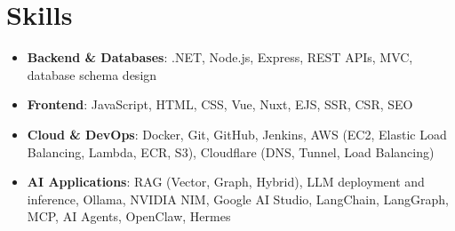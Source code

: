 \documentclass[letterpaper,11pt]{article}
\newcommand{\resumeSubHeadingListStart}{\begin{itemize}[leftmargin=*]}
\newcommand{\resumeSubHeadingListEnd}{\end{itemize}}
\begin{document}
%
\section{Skills}
  \resumeSubHeadingListStart
    \item\small{\textbf{Backend \& Databases}: .NET, Node.js, Express, REST APIs, MVC, database schema design}
    \item\small{\textbf{Frontend}: JavaScript, HTML, CSS, Vue, Nuxt, EJS, SSR, CSR, SEO}
    \item\small{\textbf{Cloud \& DevOps}: Docker, Git, GitHub, Jenkins, AWS (EC2, Elastic Load Balancing, Lambda, ECR, S3), Cloudflare (DNS, Tunnel, Load Balancing)}
    \item\small{\textbf{AI Applications}: RAG (Vector, Graph, Hybrid), LLM deployment and inference, Ollama, NVIDIA NIM, Google AI Studio, LangChain, LangGraph, MCP, AI Agents, OpenClaw, Hermes}
  \resumeSubHeadingListEnd


\end{document}
